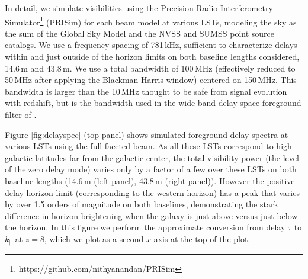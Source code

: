 \documentclass{emulateapj}
\begin{document}
In detail, we simulate visibilities using the Precision Radio Interferometry Simulator\footnote{https://github.com/nithyanandan/PRISim} (PRISim) for each beam model at various LSTs, modeling the sky as the sum of the Global Sky Model \citep{gsm} and the NVSS \citep{nvss} and SUMSS \citep{sumss,sumss2} point source catalogs. We use a frequency spacing of 781\,kHz, sufficient to characterize delays within and just outside of the horizon limits on both baseline lengths considered, 14.6\,m and 43.8\,m. We use a total bandwidth of 100\,MHz (effectively reduced to 50\,MHz after applying the Blackman-Harris window) centered on 150\,MHz. This bandwidth is larger than the 10\,MHz thought to be safe from signal evolution with redshift, but is the bandwidth used in the wide band delay space foreground filter of \citet{paper32,ali2015}.

Figure \ref{fig:delayspec} (top panel) shows simulated foreground delay spectra at various LSTs using the full-faceted beam. As all these LSTs correspond to high galactic latitudes far from the galactic center, the total visibility power (the level of the zero delay mode) varies only by a factor of a few over these LSTs on both baseline lengths (14.6\,m (left panel), 43.8\,m (right panel)). However the positive delay horizon limit (corresponding to the western horizon) has a peak that varies by over 1.5 orders of magnitude on both baselines, demonstrating the stark difference in horizon brightening when the galaxy is just above versus just below the horizon. In this figure we perform the approximate conversion from delay $\tau$ to $k_\parallel$ at $z=8$, which we plot as a second $x$-axis at the top of the plot. 
\end{document}
